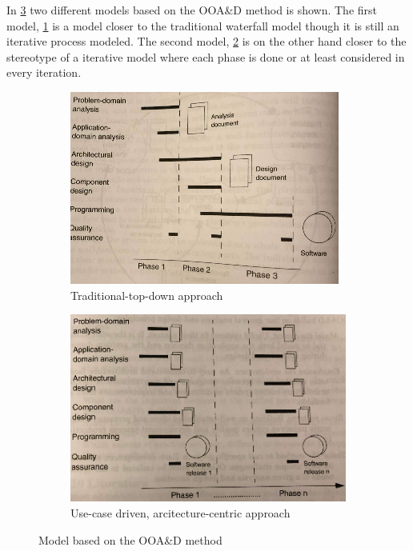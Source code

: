 
In \cref{fig:SUModels} two different models based on the OOA\&D method is shown.
The first model, \cref{fig:SUModel1} is a model closer to the traditional waterfall model though it is still an iterative process modeled.
The second model, \cref{fig:SUModel2} is on the other hand closer to the stereotype of a iterative model where each phase is done or at least considered in every iteration.

\begin{figure}[H]
	\centering
	\begin{subfigure}[b]{0.48\textwidth}
		\includegraphics[width=\textwidth]{billeder/SUModel1.png}
		\caption{Traditional-top-down approach \cite[p.~16]{Rod-Aalborg}}
		\label{fig:SUModel1}
	\end{subfigure}
	\quad
	\begin{subfigure}[b]{0.48\textwidth}
		\includegraphics[width=\textwidth]{billeder/SUModel2.png}
		\caption{Use-case driven, arcitecture-centric approach \cite[p.~17]{Rod-Aalborg}}
		\label{fig:SUModel2}
	\end{subfigure}
	\caption{Model based on the OOA\&D method}\label{fig:SUModels}
\end{figure}


